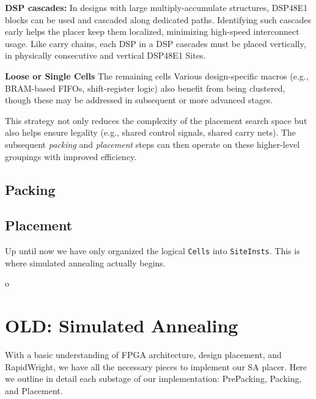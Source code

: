 \documentclass[twocolumn]{article}
\begin{document}
        \textbf{DSP cascades:} \quad
            In designs with large multiply-accumulate structures, DSP48E1 blocks can be used and cascaded along dedicated paths. 
            Identifying such cascades early helps the placer keep them localized, minimizing high-speed interconnect usage.
            Like carry chains, each DSP in a DSP cascades must be placed vertically, in physically consecutive and vertical DSP48E1 Sites.

        \textbf{Loose or Single Cells} \quad
            The remaining cells 
            Various design-specific macros (e.g., BRAM-based FIFOs, shift-register logic) also benefit from being clustered, though these may be addressed in subsequent or more advanced stages.

        This strategy not only reduces the complexity of the placement search space but also helps ensure legality (e.g., shared control signals, shared carry nets). 
        The subsequent \emph{packing} and \emph{placement} steps can then operate on these higher-level groupings with improved efficiency. 

    \subsection{Packing}
        \label{subsec:packing}

    \subsection{Placement}
        \label{subsec:placement}
        Up until now we have only organized the logical \texttt{Cells} into \texttt{SiteInsts}. 
        This is where simulated annealing actually begins. 


\newpage
o
\newpage

\section{OLD: Simulated Annealing}
    With a basic understanding of FPGA architecture, design placement, and RapidWright, we have all the necessary pieces to implement our SA placer. 
    Here we outline in detail each substage of our implementation: PrePacking, Packing, and Placement. 
\end{document}
